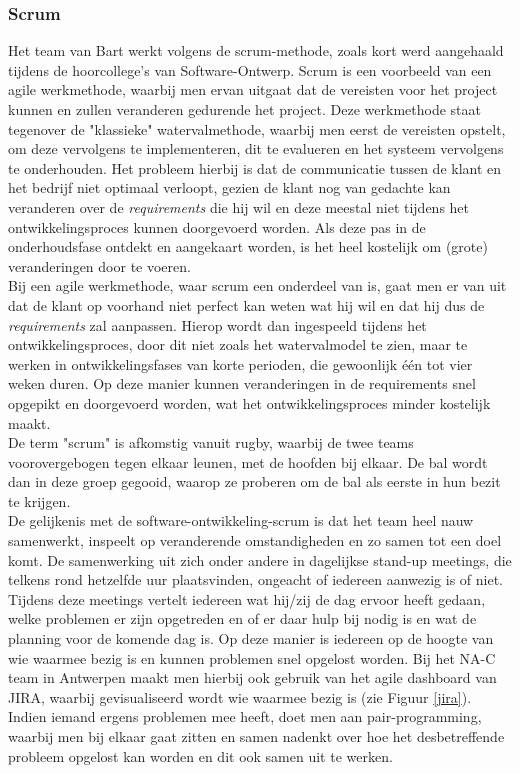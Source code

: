 \documentclass[10pt,a4paper]{article}
\begin{document}
\subsubsection{Scrum}
Het team van Bart werkt volgens de scrum-methode, zoals kort werd aangehaald tijdens de hoorcollege's van Software-Ontwerp. Scrum is een voorbeeld van een agile werkmethode, waarbij men ervan uitgaat dat de vereisten voor het project kunnen en zullen veranderen gedurende het project. Deze werkmethode staat tegenover de "klassieke" watervalmethode, waarbij men eerst de vereisten opstelt, om deze vervolgens te implementeren, dit te evalueren en het systeem vervolgens te onderhouden. Het probleem hierbij is dat de communicatie tussen de klant en het bedrijf niet optimaal verloopt, gezien de klant nog van gedachte kan veranderen over de \textit{requirements} die hij wil en deze meestal niet tijdens het ontwikkelingsproces kunnen doorgevoerd worden. Als deze pas in de onderhoudsfase ontdekt en aangekaart worden, is het heel kostelijk om (grote) veranderingen door te voeren.\\
Bij een agile werkmethode, waar scrum een onderdeel van is, gaat men er van uit dat de klant op voorhand niet perfect kan weten wat hij wil en dat hij dus de \textit{requirements} zal aanpassen. Hierop wordt dan ingespeeld tijdens het ontwikkelingsproces, door dit niet zoals het watervalmodel te zien, maar te werken in ontwikkelingsfases van korte perioden, die gewoonlijk \'e\'en tot vier weken duren. Op deze manier kunnen veranderingen in de requirements snel opgepikt en doorgevoerd worden, wat het ontwikkelingsproces minder kostelijk maakt.\\
De term "scrum" is afkomstig vanuit rugby, waarbij de twee teams voorovergebogen tegen elkaar leunen, met de hoofden bij elkaar. De bal wordt dan in deze groep gegooid, waarop ze proberen om de bal als eerste in hun bezit te krijgen.\\
De gelijkenis met de software-ontwikkeling-scrum is dat het team heel nauw samenwerkt, inspeelt op veranderende omstandigheden en zo samen tot een doel komt. De samenwerking uit zich onder andere in dagelijkse stand-up meetings, die telkens rond hetzelfde uur plaatsvinden, ongeacht of iedereen aanwezig is of niet. Tijdens deze meetings vertelt iedereen wat hij/zij de dag ervoor heeft gedaan, welke problemen er zijn opgetreden en of er daar hulp bij nodig is en wat de planning voor de komende dag is. Op deze manier is iedereen op de hoogte van wie waarmee bezig is en kunnen problemen snel opgelost worden. Bij het NA-C team in Antwerpen maakt men hierbij ook gebruik van het agile dashboard van JIRA, waarbij gevisualiseerd wordt wie waarmee bezig is (zie Figuur \ref{jira}). Indien iemand ergens problemen mee heeft, doet men aan pair-programming, waarbij men bij elkaar gaat zitten en samen nadenkt over hoe het desbetreffende probleem opgelost kan worden en dit ook samen uit te werken.\\
\end{document}
